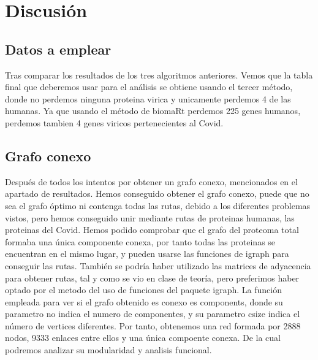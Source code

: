 \section{Discusión}
\begin{Document}

\subsection{Datos a emplear}
Tras comparar los resultados de los tres algoritmos anteriores. Vemos que la tabla final que deberemos usar para el análisis se obtiene usando el tercer método, donde no perdemos ninguna proteina virica y unicamente perdemos 4 de las humanas. 
Ya que usando el método de biomaRt perdemos 225 genes humanos, perdemos tambien 4 genes viricos pertenecientes al Covid. 

\subsection{Grafo conexo}
Después de todos los intentos por obtener un grafo conexo, mencionados en el apartado de resultados. Hemos conseguido obtener el grafo conexo, puede que no sea el grafo óptimo ni contenga todas las rutas, debido a los diferentes problemas vistos, pero hemos conseguido unir mediante rutas de proteinas humanas, las proteinas del Covid. 
Hemos podido comprobar que el grafo del proteoma total formaba una única componente conexa, por tanto todas las proteinas se encuentran en el mismo lugar, y pueden usarse las funciones de igraph para conseguir las rutas. 
También se podría haber utilizado las matrices de adyacencia para obtener rutas, tal y como se vio en clase de teoría, pero preferimos haber optado por el metodo del uso de funciones del paquete igraph. La función empleada para ver si el grafo obtenido es conexo es components, donde su parametro no indica el numero de componentes, y su parametro csize indica el número de vertices diferentes. 
Por tanto, obtenemos una red formada por 2888 nodos, 9333 enlaces entre ellos y una única compoente conexa. De la cual podremos analizar su modularidad y analisis funcional.
\end{Document}
